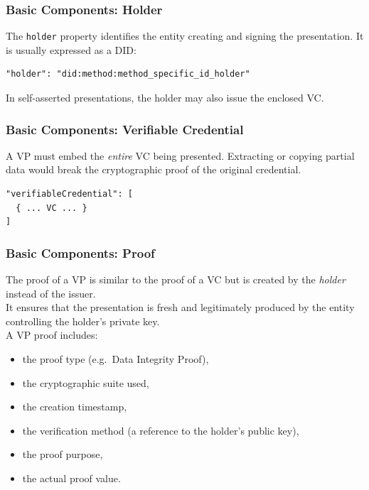 \subsubsection*{Basic Components: Holder}

The \texttt{holder} property identifies the entity creating and signing the
presentation.  
It is usually expressed as a DID:

\begin{verbatim}
"holder": "did:method:method_specific_id_holder"
\end{verbatim}

In self-asserted presentations, the holder may also issue the enclosed VC.

\subsubsection*{Basic Components: Verifiable Credential}

A VP must embed the \emph{entire} VC being presented.  
Extracting or copying partial data would break the cryptographic proof of the
original credential.

\begin{verbatim}
"verifiableCredential": [
  { ... VC ... }
]
\end{verbatim}

\subsubsection*{Basic Components: Proof}

The proof of a VP is similar to the proof of a VC but is created by the \emph{holder}
instead of the issuer. \\
It ensures that the presentation is fresh and legitimately produced by the entity
controlling the holder's private key.\\
A VP proof includes:
\begin{itemize}
    \item the proof type (e.g.\ Data Integrity Proof),
    \item the cryptographic suite used,
    \item the creation timestamp,
    \item the verification method (a reference to the holder’s public key),
    \item the proof purpose,
    \item the actual proof value.
\end{itemize}

